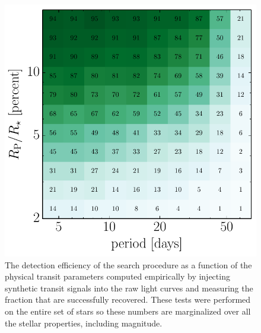 \begin{figure}[p]
\begin{center}
\includegraphics{figures/ketu/completeness.pdf}
\end{center}
\caption{%
The detection efficiency of the search procedure as a function of the
physical transit parameters computed empirically by
injecting synthetic transit signals into the raw light curves and measuring
the fraction that are successfully recovered.
These tests were performed on the entire set of stars so these numbers are
marginalized over all the stellar properties, including magnitude.
}
\end{figure}

